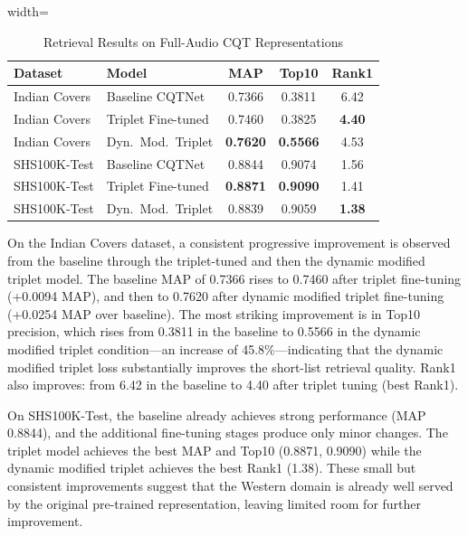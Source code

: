\documentclass[conference]{IEEEtran}
\begin{document}
\begin{table}[htbp]
    \caption{Retrieval Results on Full-Audio CQT Representations}
    \label{tab:full_audio}
    \centering
    \begin{adjustbox}{width=\columnwidth}
    \begin{tabular}{llccc}
    \toprule
    \textbf{Dataset} & \textbf{Model} & \textbf{MAP} & \textbf{Top10} & \textbf{Rank1} \\
    \midrule
    Indian Covers & Baseline CQTNet & 0.7366 & 0.3811 & 6.42 \\
    Indian Covers & Triplet Fine-tuned & 0.7460 & 0.3825 & \textbf{4.40} \\
    Indian Covers & Dyn.\ Mod.\ Triplet & \textbf{0.7620} & \textbf{0.5566} & 4.53 \\
    \midrule
    SHS100K-Test  & Baseline CQTNet & 0.8844 & 0.9074 & 1.56 \\
    SHS100K-Test  & Triplet Fine-tuned & \textbf{0.8871} & \textbf{0.9090} & 1.41 \\
    SHS100K-Test  & Dyn.\ Mod.\ Triplet & 0.8839 & 0.9059 & \textbf{1.38} \\
    \bottomrule
    \end{tabular}
    \end{adjustbox}
\end{table}

On the Indian Covers dataset, a consistent progressive improvement is observed from the baseline through the triplet-tuned and then the dynamic modified triplet model. The baseline MAP of 0.7366 rises to 0.7460 after triplet fine-tuning (+0.0094 MAP), and then to 0.7620 after dynamic modified triplet fine-tuning (+0.0254 MAP over baseline). The most striking improvement is in Top10 precision, which rises from 0.3811 in the baseline to 0.5566 in the dynamic modified triplet condition—an increase of 45.8\%—indicating that the dynamic modified triplet loss substantially improves the short-list retrieval quality. Rank1 also improves: from 6.42 in the baseline to 4.40 after triplet tuning (best Rank1).

On SHS100K-Test, the baseline already achieves strong performance (MAP 0.8844), and the additional fine-tuning stages produce only minor changes. The triplet model achieves the best MAP and Top10 (0.8871, 0.9090) while the dynamic modified triplet achieves the best Rank1 (1.38). These small but consistent improvements suggest that the Western domain is already well served by the original pre-trained representation, leaving limited room for further improvement.
\end{document}
